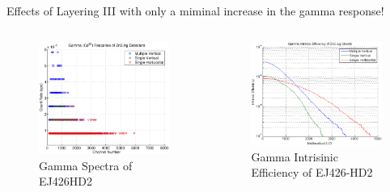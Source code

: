 \begin{frame}{Effects of Layering III}
with only a miminal increase in the gamma response!
\begin{columns}[onlytextwidth]
\begin{column}{0.45\textwidth}
	\tiny
	\begin{figure}
		\centering
		\includegraphics[width=\textwidth]{images/EJ426HD_Multi_GammaComparison.eps}
		\caption{Gamma Spectra of EJ426HD2}
	\end{figure}
\end{column}
\begin{column}{0.45\textwidth}
	\tiny
	\begin{figure}
		\centering
		\includegraphics[width=\textwidth]{images/EJ426HD_Multi_GammaIntEff.eps}
		\caption{Gamma Intrisinic Efficiency of EJ426-HD2}
\end{figure}
\end{column}
\end{columns}
\end{frame}
